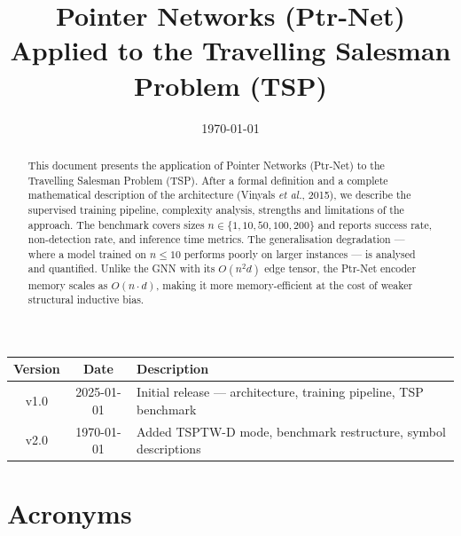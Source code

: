 \documentclass[12pt,a4paper]{article}
\title{%
  \LARGE\textbf{Pointer Networks (Ptr-Net)}\\[0.6em]
  \large Applied to the Travelling Salesman Problem (TSP)
}
\date{\today}
\begin{document}

\maketitle
\thispagestyle{empty}

\begin{center}
\begin{tabularx}{\linewidth}{ccX}
\toprule
\textbf{Version} & \textbf{Date} & \textbf{Description} \\
\midrule
v1.0 & 2025-01-01 & Initial release — architecture, training pipeline, TSP benchmark \\
v2.0 & \today     & Added TSPTW-D mode, benchmark restructure, symbol descriptions \\
\bottomrule
\end{tabularx}
\end{center}

\begin{abstract}
This document presents the application of Pointer Networks (Ptr-Net) to the
Travelling Salesman Problem (TSP).
After a formal definition and a complete mathematical description of the
architecture (Vinyals \textit{et al.}, 2015), we describe the supervised
training pipeline, complexity analysis, strengths and limitations of the
approach.
The benchmark covers sizes $n \in \{1, 10, 50, 100, 200\}$ and reports
success rate, non-detection rate, and inference time metrics.
The generalisation degradation --- where a model trained on $n \leq 10$
performs poorly on larger instances --- is analysed and quantified.
Unlike the GNN with its $O(n^2 d)$ edge tensor, the Ptr-Net encoder memory
scales as $O(n \cdot d)$, making it more memory-efficient at the cost of
weaker structural inductive bias.
\end{abstract}

\tableofcontents
\newpage

\section*{Acronyms}
\end{document}
